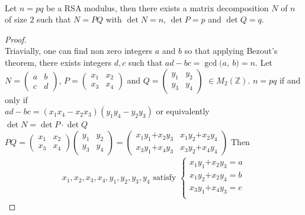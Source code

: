 \documentclass[10pt,a4paper]{amsart}
\begin{document}
\begin{theorem} \ \\ \rm{
Let $n=pq$ be a RSA modulus, then there exists a matrix decomposition  $N$ of $n$ of size $2$ such that $N=PQ$ with $\det N=n$, $\det P=p$ and $\det Q=q$.
}
\end{theorem}

\begin{proof} \ \\ 
Triavially, one can find non zero integers $a$ and $b$ so that applying Bezout's theorem, there exists integers $d, c$ such that $ad-bc=\gcd\text{(}a, \ b\text{)}=n$.
Let $N=
\begin{pmatrix}
a & b \\ 
c & d
\end{pmatrix}$, $P=
\begin{pmatrix}
x_{1} & x_{2} \\ 
x_{3} & x_{4}
\end{pmatrix} $ and $Q=
\begin{pmatrix}
y_{1} & y_{2} \\ 
y_{3} & y_{4}
\end{pmatrix}$ $\in \displaystyle  M_{2}\left(\mathbb{Z}\right)$.
$n=pq$ if and only if \\ $\displaystyle ad-bc=\left(x_{1}x_{4}-x_{2}x_{3}\right) \left(y_{1}y_{4}-y_{2}y_{3}\right)$ or equivalently \\ $\displaystyle\det N=\det P \cdot \det Q$\\
$PQ=\begin{pmatrix}
x_{1} & x_{2} \\ 
x_{3} & x_{4}
\end{pmatrix} 
\begin{pmatrix}
y_{1} & y_{2} \\ 
y_{3} & y_{4}
\end{pmatrix}=
\begin{pmatrix}
x_{1}y_{1} \text{+} x_{2}y_{3} & x_{1}y_{2} \text{+} x_{2}y_{4} \\ 
x_{3}y_{1} \text{+} x_{4}y_{3} & x_{3}y_{2} \text{+} x_{4}y_{4}
\end{pmatrix}$
Then
\begin{eqnarray}\label{s1}
	x_{1}, x_{2}, x_{3}, x_{4}, y_{1}, y_{2}, y_{3}, y_{4} \text{ satisfy }
	\left\lbrace
	\begin{array}{ll}
	x_{1}y_{1} \text{+} x_{2}y_{3}=a\\
	x_{1}y_{2} \text{+} x_{2}y_{4}=b\\
	x_{3}y_{1} \text{+} x_{4}y_{3}=c\\

\end{array}
\end{eqnarray}
\end{proof}
\end{document}
